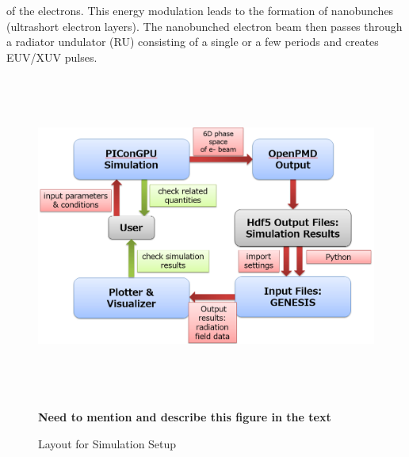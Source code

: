 of the electrons. This energy modulation leads to the formation of nanobunches
(ultrashort electron layers). The nanobunched electron beam then passes through
a radiator undulator (RU) consisting of a single or a few periods and creates
EUV/XUV pulses.
%
\begin{figure}[ht]
  \includegraphics[width=5.9425in,height=4.1882in]{figures/lwfafel-img002.png}
  \caption{Layout for Simulation Setup}
  \label{fig:lwfa-simulation_loop}
\textbf{Need to mention and describe this figure in the text}
\end{figure}
%
